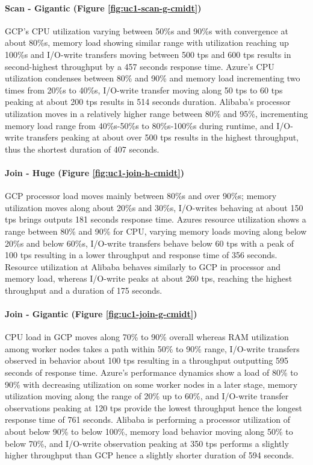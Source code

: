 \documentclass[review]{elsarticle}
\begin{document}
\paragraph{Scan - Gigantic (Figure \ref{fig:uc1-scan-g-cmidt})}GCP's CPU utilization varying between 50\%s and 90\%s with convergence at about 80\%s, memory load showing similar range with utilization reaching up 100\%s and I/O-write transfers moving between 500 tps and 600 tps results in second-highest throughput by a 457 seconds response time. Azure's CPU utilization condenses between 80\% and 90\% and memory load incrementing two times from 20\%s to 40\%s, I/O-write transfer moving along 50 tps to 60 tps peaking at about 200 tps results in 514 seconds duration. Alibaba's processor utilization moves in a relatively higher range between 80\% and 95\%, incrementing memory load range from 40\%s-50\%s to 80\%s-100\%s during runtime, and I/O-write transfers peaking at about over 500 tps results in the highest throughput, thus the shortest duration of 407 seconds.

\paragraph{Join - Huge (Figure \ref{fig:uc1-join-h-cmidt})}GCP processor load moves mainly between 80\%s and over 90\%s; memory utilization moves along about 20\%s and 30\%s, I/O-writes behaving at about 150 tps brings outputs 181 seconds response time. Azures resource utilization shows a range between 80\% and 90\% for CPU, varying memory loads moving along below 20\%s and below 60\%s, I/O-write transfers behave below 60 tps with a peak of 100 tps resulting in a lower throughput and response time of 356 seconds. Resource utilization at Alibaba behaves similarly to GCP in processor and memory load, whereas I/O-write peaks at about 260 tps, reaching the highest throughput and a duration of 175 seconds.

\paragraph{Join - Gigantic (Figure \ref{fig:uc1-join-g-cmidt})}CPU load in GCP moves along 70\% to 90\% overall whereas RAM utilization among worker nodes takes a path within 50\% to 90\% range, I/O-write transfers observed in behavior about 100 tps resulting in a throughput outputting 595 seconds of response time. Azure's performance dynamics show a load of 80\% to 90\% with decreasing utilization on some worker nodes in a later stage, memory utilization moving along the range of 20\% up to 60\%, and I/O-write transfer observations peaking at 120 tps provide the lowest throughput hence the longest response time of 761 seconds. Alibaba is performing a processor utilization of about below 90\% to below 100\%, memory load behavior moving along 50\% to below 70\%, and I/O-write observation peaking at 350 tps performs a slightly higher throughput than GCP hence a slightly shorter duration of 594 seconds.
\end{document}
